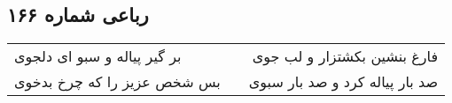 \begin{center}
\section*{رباعی شماره ۱۶۶}
\label{sec:sh166}
\begin{longtable}{l p{0.5cm} r}
بر گیر پیاله و سبو ای دلجوی
&&
فارغ بنشین بکشتزار و لب جوی
\\
بس شخص عزیز را که چرخ بدخوی
&&
صد بار پیاله کرد و صد بار سبوی
\\
\end{longtable}
\end{center}
